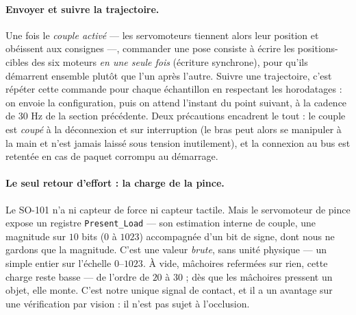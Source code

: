 \paragraph{Envoyer et suivre la trajectoire.} Une fois le \emph{couple activé} --- les servomoteurs tiennent alors leur position et obéissent aux consignes ---, commander une pose consiste à écrire les positions-cibles des six moteurs \emph{en une seule fois} (écriture synchrone), pour qu'ils démarrent ensemble plutôt que l'un après l'autre. Suivre une trajectoire, c'est répéter cette commande pour chaque échantillon en respectant les horodatages : on envoie la configuration, puis on attend l'instant du point suivant, à la cadence de $30$ Hz de la section précédente. Deux précautions encadrent le tout : le couple est \emph{coupé} à la déconnexion et sur interruption (le bras peut alors se manipuler à la main et n'est jamais laissé sous tension inutilement), et la connexion au bus est retentée en cas de paquet corrompu au démarrage.

\paragraph{Le seul retour d'effort : la charge de la pince.} Le SO-101 n'a ni capteur de force ni capteur tactile. Mais le servomoteur de pince expose un registre \texttt{Present\_Load} --- son estimation interne de couple, une magnitude sur $10$ bits ($0$ à $1023$) accompagnée d'un bit de signe, dont nous ne gardons que la magnitude. C'est une valeur \emph{brute}, sans unité physique --- un simple entier sur l'échelle $0$--$1023$. À vide, mâchoires refermées sur rien, cette charge reste basse --- de l'ordre de $20$ à $30$ ; dès que les mâchoires pressent un objet, elle monte. C'est notre unique signal de contact, et il a un avantage sur une vérification par vision : il n'est pas sujet à l'occlusion.

